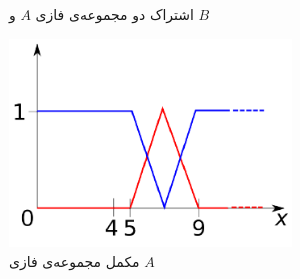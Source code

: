 \begin{exmp}
\begin{figure}[h]
	\vspace{-0.5cm}
	\caption{اشتراک دو مجموعه‌ی فازی $ A $ و $ B $} \label{fig:f_fset_op_exmp_intersect}
\end{figure}
\begin{figure}[h]
	\centering 
	\includegraphics[width=75mm]{Images/Fig11.png}
	\vspace{-0.5cm}
	\caption{مکمل مجموعه‌ی فازی $A$} \label{fig:f_fset_op_exmp_complement}
\end{figure}\cite{Spada}\\
\end{exmp}



